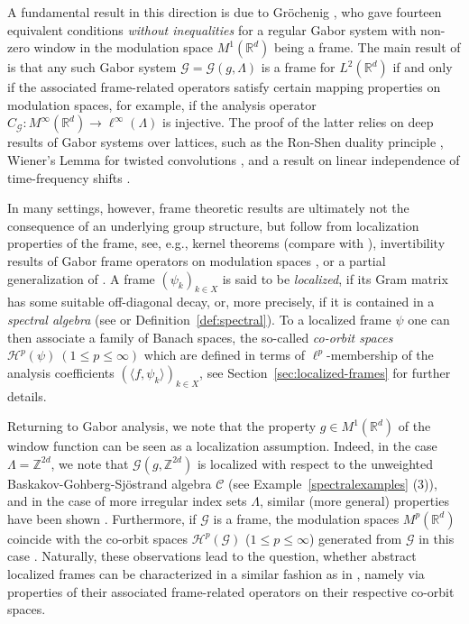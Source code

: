 \documentclass{amsart}
\def\Hil{\mathcal{H}}
\newcommand{\R}[0]{{\mathbb{R}}}
\newcommand{\G}[0]{{\mathcal{G}}}
\renewcommand{\H}{{\mathcal{H}}}
\begin{document}
A fundamental result in this direction is due to Gr\"ochenig \cite{gro07ineq}, who gave fourteen equivalent conditions \emph{without inequalities} for a regular Gabor system with non-zero window in the modulation space $M^1(\R^d)$ being a frame. %
The main result of \cite{gro07ineq} is that any such Gabor system $\G = \G(g,\Lambda)$ is a frame for $L^2(\mathbb{R}^d)$ if and only if the associated frame-related operators satisfy certain mapping properties on modulation spaces, for example, if the analysis operator $C_{\G}: M^\infty(\mathbb{R}^{d}) \to \ell^{\infty}(\Lambda)$ is injective. The proof of the latter relies on deep results %
of Gabor systems over lattices, such as the Ron-Shen duality principle \cite{ron-shen}, Wiener's Lemma for twisted convolutions \cite{GrLe04}, and a result on linear independence of time-frequency shifts %
\cite{gro07ineq}.

In many settings, however, frame theoretic results are ultimately not the consequence of an underlying group structure, but follow from localization properties of the frame, see, e.g., kernel theorems (compare \cite{xxlgrospeck19,feichtinger80cras} with \cite{xxlbysp24}), invertibility results of Gabor frame operators on modulation spaces \cite{groe04,GrLe04,GROCHENIG2015388}, or a partial generalization \cite[Theorem~5.1]{GROCHENIG2015388} of \cite[Theorem~3.1]{gro07ineq}. A frame $(\psi_k)_{k\in X}$ is said to be \emph{localized}, if its Gram matrix has some suitable off-diagonal decay, or, more precisely, if it is contained in a \emph{spectral algebra} (see \cite{forngroech1} or Definition~\ref{def:spectral}). 
To a localized frame $\psi$ one can then associate a family of Banach spaces, the so-called \emph{co-orbit spaces} $\H^p(\psi)\ (1\leq p\leq \infty)$ which are defined in terms of $\ell^p$-membership of the analysis coefficients $(\langle f,\psi_k \rangle)_{k\in X}$, see Section~\ref{sec:localized-frames} for further details.

Returning to Gabor analysis, we note that the property $g\in M^1(\mathbb{R}^d)$ of the window function can be seen as a localization assumption. Indeed, in the case $\Lambda = \mathbb{Z}^{2d}$, we note that $\G(g,\mathbb{Z}^{2d})$ is localized with respect to the unweighted Baskakov-Gohberg-Sj\"ostrand algebra $\mathcal{C}$ (see Example~\ref{spectralexamples} (3)), and in the case of more irregular index sets $\Lambda$, similar (more general) properties have been shown \cite{GROCHENIG2015388}. Furthermore, if $\G$ is a frame, the modulation spaces $M^p(\R^d)$ coincide with the co-orbit spaces $\Hil^p(\G)$ ($1\leq p \leq \infty$) generated from $\G$ in this case \cite[Theorem~3.2]{GROCHENIG2015388}. Naturally, 
these observations lead to the question, whether abstract localized frames can be characterized in a similar fashion as in \cite{gro07ineq}, namely via properties of their associated frame-related operators on their respective co-orbit spaces. 
\end{document}
